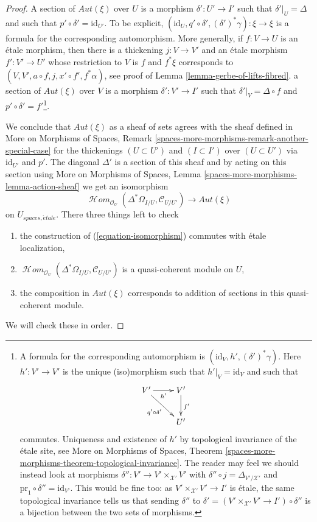 \documentclass[10pt,a4paper]{amsart}
\theoremstyle{plain}
\theoremstyle{definition}
\theoremstyle{remark}
\numberwithin{equation}{subsection}
\def\SheafHom{\mathop{\mathcal{H}\!\mathit{om}}\nolimits}
\def\etale{{\acute{e}tale}}
\begin{document}
\begin{proof}
\medskip\noindent
A section of $\mathit{Aut}(\xi)$ over $U$ is a morphism $\delta' : U' \to I'$
such that $\delta'|_U = \Delta$ and such that
$p' \circ \delta' = \text{id}_{U'}$. To be explicit,
$(\text{id}_U, q' \circ \delta', (\delta')^*\gamma) : \xi \to \xi$
is a formula for the corresponding automorphism.
More generally, if
$f : V \to U$ is an \'etale morphism, then there is a thickening
$j : V \to V'$ and an \'etale morphism
$f' : V' \to U'$ whose restriction to $V$ is $f$ and $f^*\xi$
corresponds to $(V, V', a \circ f, j, x' \circ f', f^*\alpha)$, see proof of
Lemma \ref{lemma-gerbe-of-lifts-fibred}.
 a section of $\mathit{Aut}(\xi)$ over $V$ is a morphism
$\delta' : V' \to I'$
such that $\delta'|_V = \Delta \circ f$
and $p' \circ \delta' = f'$\footnote{A formula for the corresponding
automorphism is $(\text{id}_V, h', (\delta')^*\gamma)$.
Here $h' : V' \to V'$ is the unique (iso)morphism such that
$h'|_V = \text{id}_V$ and such that
$$
\xymatrix{
V' \ar[r]_{h'} \ar[rd]_{q' \circ \delta'} & V' \ar[d]^{f'} \\
& U'
}
$$
commutes. Uniqueness and existence of $h'$ by topological invariance of
the \'etale site, see More on Morphisms of Spaces,
Theorem \ref{spaces-more-morphisms-theorem-topological-invariance}.
The reader may feel we should instead look at morphisms
$\delta'' : V' \to V' \times_{\mathcal{X}'} V'$ with
$\delta'' \circ j = \Delta_{V'/\mathcal{X}'}$ and
$\text{pr}_1 \circ \delta'' = \text{id}_{V'}$.
This would be fine too: as $V' \times_{\mathcal{X}'} V' \to I'$ is \'etale,
the same topological invariance tells us that sending
$\delta''$ to $\delta' = (V' \times_{\mathcal{X}'} V' \to I') \circ \delta''$
is a bijection between the two
sets of morphisms.}.

\medskip\noindent
We conclude that $\mathit{Aut}(\xi)$ as a sheaf of sets agrees with
the sheaf defined in
More on Morphisms of Spaces, Remark
\ref{spaces-more-morphisms-remark-another-special-case}
for the thickenings $(U \subset U')$ and $(I \subset I')$ over
$(U \subset U')$ via $\text{id}_{U'}$ and $p'$.
The diagonal $\Delta'$ is a section of this sheaf and by
acting on this section using More on Morphisms of Spaces, Lemma
\ref{spaces-more-morphisms-lemma-action-sheaf}
we get an isomorphism
\begin{equation}
\label{equation-isomorphism}
\SheafHom_{\mathcal{O}_U}(\Delta^*\Omega_{I/U}, \mathcal{C}_{U/U'})
\longrightarrow
\mathit{Aut}(\xi)
\end{equation}
on $U_{spaces, \etale}$. There three things left to check
\begin{enumerate}
\item the construction of (\ref{equation-isomorphism})
commutes with \'etale localization,
\item $\SheafHom_{\mathcal{O}_U}(\Delta^*\Omega_{I/U}, \mathcal{C}_{U/U'})$
is a quasi-coherent module on $U$,
\item the composition in $\mathit{Aut}(\xi)$ corresponds
to addition of sections in this quasi-coherent module.
\end{enumerate}
We will check these in order.


\end{proof}
\end{document}
